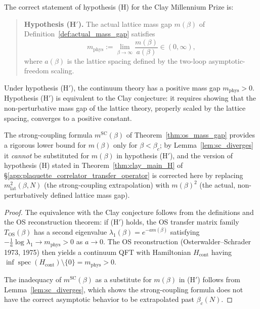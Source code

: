 \begin{theorem}
\label{thm:corrected_H}
The correct statement of hypothesis (H) for the Clay Millennium Prize is:
\begin{quote}
\textbf{Hypothesis (H$'$).} The actual lattice mass gap $m(\beta)$
of Definition~\ref{def:actual_mass_gap} satisfies
\[
m_{\mathrm{phys}}
:= \lim_{\beta\to\infty}\frac{m(\beta)}{a(\beta)} \in (0,\infty),
\]
where $a(\beta)$ is the lattice spacing defined by the two-loop
asymptotic-freedom scaling.
\end{quote}

Under hypothesis (H$'$), the continuum theory has a positive mass gap
$m_{\mathrm{phys}}>0$.  Hypothesis (H$'$) is equivalent to the Clay conjecture:
it requires showing that the non-perturbative mass gap of the lattice theory,
properly scaled by the lattice spacing, converges to a positive constant.

The strong-coupling formula $m^{\mathrm{SC}}(\beta)$ of
Theorem~\ref{thm:os_mass_gap} provides a rigorous lower bound for $m(\beta)$
only for $\beta<\beta_{c}$; by Lemma~\ref{lem:sc_diverges} it \emph{cannot}
be substituted for $m(\beta)$ in hypothesis (H$'$), and the version of
hypothesis (H) stated in Theorem~\ref{thm:clay_main_H} of
\S\ref{app:plaquette_correlator_transfer_operator} is corrected here by
replacing $m_{\mathrm{lat}}^{2}(\beta,N)$ (the strong-coupling extrapolation)
with $m(\beta)^{2}$ (the actual, non-perturbatively defined lattice mass gap).
\end{theorem}

\begin{proof}
The equivalence with the Clay conjecture follows from the definitions and the
OS reconstruction theorem: if (H$'$) holds, the OS transfer matrix family
$T_{\mathrm{OS}}(\beta)$ has a second eigenvalue $\lambda_{1}(\beta)=
e^{-am(\beta)}$ satisfying $-\frac{1}{a}\log\lambda_{1}\to m_{\mathrm{phys}}>0$
as $a\to 0$. The OS reconstruction (Osterwalder--Schrader 1973, 1975) then
yields a continuum QFT with Hamiltonian $H_{\mathrm{cont}}$ having
$\inf\operatorname{spec}(H_{\mathrm{cont}})\setminus\{0\}=m_{\mathrm{phys}}>0$.

The inadequacy of $m^{\mathrm{SC}}(\beta)$ as a substitute for $m(\beta)$ in
(H$'$) follows from Lemma~\ref{lem:sc_diverges}, which shows the strong-coupling
formula does not have the correct asymptotic behavior to be extrapolated past
$\beta_{c}(N)$.
\end{proof}

